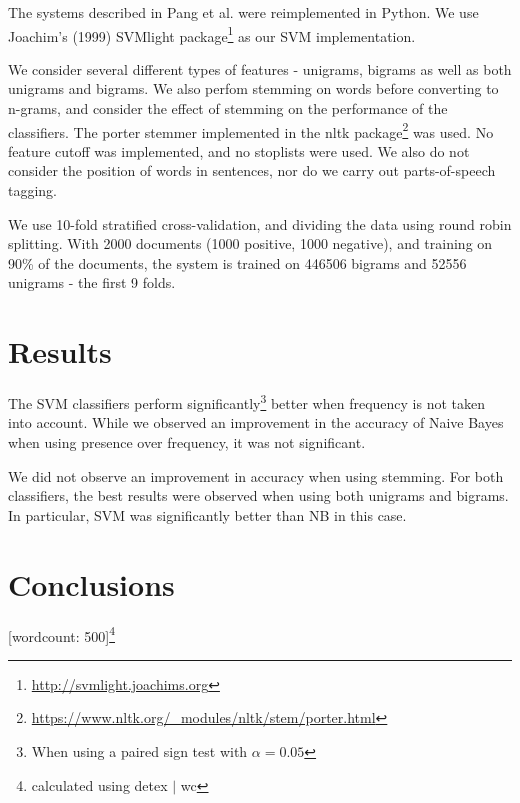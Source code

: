 \documentclass[12pt,a4paper]{article}
\begin{document}
\begin{multicols}{2}
The systems described in Pang et al. were reimplemented in Python. We use Joachim's (1999) SVMlight package\footnote{\url{http://svmlight.joachims.org}} as our SVM implementation.

We consider several different types of features - unigrams, bigrams as well as both unigrams and bigrams. We also perfom stemming on words before converting to n-grams, and consider the effect of stemming on the performance of the classifiers. The porter stemmer implemented in the nltk package\footnote{\url{https://www.nltk.org/_modules/nltk/stem/porter.html}} was used. No feature cutoff was implemented, and no stoplists were used. We also do not consider the position of words in sentences, nor do we carry out parts-of-speech tagging.

We use 10-fold stratified cross-validation, and dividing the data using round robin splitting. With 2000 documents (1000 positive, 1000 negative), and training on 90\% of the documents, the system is trained on 446506 bigrams and 52556 unigrams - the first 9 folds.

\section{Results}

The SVM classifiers perform significantly\footnote{When using a paired sign test with $\alpha = 0.05$} better when frequency is not taken into account. While we observed an improvement in the accuracy of Naive Bayes when using presence over frequency, it was not significant.

We did not observe an improvement in accuracy when using stemming. For both classifiers, the best results were observed when using both unigrams and bigrams. In particular, SVM was significantly better than NB in this case.

\section{Conclusions}

\centerline{[wordcount: 500]\footnote{calculated using detex $|$ wc}}

\end{multicols}

\clearpage


\end{document}
